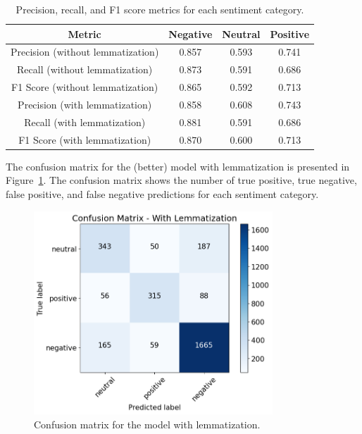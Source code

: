 \documentclass{article}
\begin{document}
\begin{table}[H]
    \begin{tabular}{cccc}
        \hline
        \textbf{Metric} & \textbf{Negative} & \textbf{Neutral} & \textbf{Positive} \\
        \hline
        Precision (without lemmatization) & 0.857 & 0.593 & 0.741 \\
        Recall (without lemmatization) & 0.873 & 0.591 & 0.686 \\
        F1 Score (without lemmatization) & 0.865 & 0.592 & 0.713 \\
        \hline
        Precision (with lemmatization) & 0.858 & 0.608 & 0.743 \\
        Recall (with lemmatization) & 0.881 & 0.591 & 0.686 \\
        F1 Score (with lemmatization) & 0.870 & 0.600 & 0.713 \\
        \hline
    \end{tabular}
    \caption{\label{tab:precision_recall_f1} Precision, recall, and F1 score metrics for each sentiment category.}
\end{table}

The confusion matrix for the (better) model with lemmatization is presented in Figure~\ref{fig:confusion_matrix_with_lemmatization}. The confusion matrix shows the number of true positive, true negative, false positive, and false negative predictions for each sentiment category.

\begin{figure}[H]
    \centering
    \includegraphics[width=0.8\textwidth]{data/plots/confusion_matrix_with_lemmatization.png}
    \caption{\label{fig:confusion_matrix_with_lemmatization} Confusion matrix for the model with lemmatization.}
\end{figure}
\end{document}
